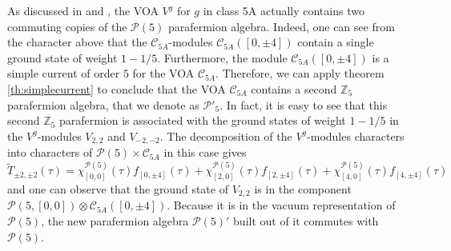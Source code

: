 \documentclass[11pt,reqno]{article}
\newcommand{\be}{\begin{equation}}
\newcommand{\ee}{\end{equation}}
\newcommand{\calC}{\mathcal{C}}
\newcommand{\ZZ}{\mathbb{Z}}
\newcommand{\paraf}{\mathcal{P}}
\begin{document}
As discussed in \cite{LamYamadaYamauchi} and \cite{Bae:2020pvv}, the VOA $V^g$ for $g$ in class 5A actually contains two commuting copies of the $\paraf(5)$ parafermion algebra. Indeed, one can see from the character above that the $\calC_{5A}$-modules $\calC_{5A}([0,\pm 4])$ contain a single ground state of weight $1-1/5$. Furthermore, the module $\calC_{5A}([0,\pm 4])$ is a simple current of order $5$ for the VOA $\calC_{5A}$. Therefore, we can apply theorem \ref{th:simplecurrent} to conclude that the VOA $\calC_{5A}$ contains a second $\ZZ_5$ parafermion algebra, that we denote as $\paraf'_5$. In fact, it is easy to see that this second $\ZZ_5$ parafermion is associated with the ground states of weight $1-1/5$ in the $V^g$-modules $V_{2,2}$ and $V_{-2,-2}$. The decomposition of the $V^g$-modules characters into characters of $\paraf(5)\times \calC_{5A}$ in this case gives
\be \tilde T_{\pm 2,\pm 2}(\tau)=\chi^{\paraf(5)}_{[0,0]}(\tau)f_{[0,\pm 4]}(\tau)+\chi^{\paraf(5)}_{[2,0]}(\tau)f_{[2,\pm 4]}(\tau)+\chi^{\paraf(5)}_{[4,0]}(\tau)f_{[4,\pm 4]}(\tau)
\ee and one can observe that the ground state of $V_{2,2}$ is in the component $\paraf(5,[0,0])\otimes \calC_{5A}([0,\pm 4])$. Because it is in the vacuum representation of $\paraf(5)$, the new parafermion algebra $\paraf(5)'$ built out of it commutes with $\paraf(5)$.
\end{document}
